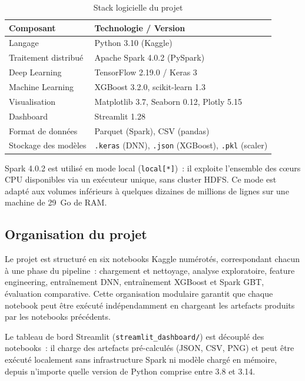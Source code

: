 \begin{table}[H]
\centering
\caption{Stack logicielle du projet}
\label{tab:stack}
\begin{tabular}{ll}
\toprule
\textbf{Composant}       & \textbf{Technologie / Version} \\
\midrule
Langage                  & Python 3.10 (Kaggle) \\
Traitement distribué     & Apache Spark 4.0.2 (PySpark) \\
Deep Learning            & TensorFlow 2.19.0 / Keras 3 \\
Machine Learning         & XGBoost 3.2.0, scikit-learn 1.3 \\
Visualisation            & Matplotlib 3.7, Seaborn 0.12, Plotly 5.15 \\
Dashboard                & Streamlit 1.28 \\
Format de données        & Parquet (Spark), CSV (pandas) \\
Stockage des modèles     & \texttt{.keras} (DNN), \texttt{.json} (XGBoost), \texttt{.pkl} (scaler) \\
\bottomrule
\end{tabular}
\end{table}

Spark 4.0.2 est utilisé en mode local (\texttt{local[*]})~: il exploite l'ensemble
des cœurs CPU disponibles via un exécuteur unique, sans cluster HDFS.
Ce mode est adapté aux volumes inférieurs à quelques dizaines de millions de lignes
sur une machine de 29~Go de RAM.

\subsection{Organisation du projet}

Le projet est structuré en six notebooks Kaggle numérotés, correspondant chacun
à une phase du pipeline~: chargement et nettoyage, analyse exploratoire,
feature engineering, entraînement DNN, entraînement XGBoost et Spark GBT, évaluation
comparative. Cette organisation modulaire garantit que chaque notebook peut être
exécuté indépendamment en chargeant les artefacts produits par les notebooks précédents.

Le tableau de bord Streamlit (\texttt{streamlit\_dashboard/}) est découplé des notebooks~:
il charge des artefacts pré-calculés (JSON, CSV, PNG) et peut être exécuté localement
sans infrastructure Spark ni modèle chargé en mémoire, depuis n'importe quelle version
de Python comprise entre 3.8 et 3.14.

